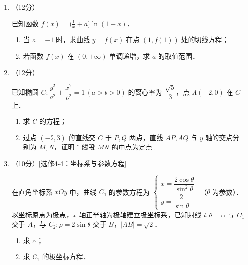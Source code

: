 \begin{description}
\begin{enumerate}[leftmargin=5pt]
        \begin{enumerate}[label=(\arabic*)]
            \item 证明：$EF\parallel$ 平面 $ADO$；
            \item 证明：平面 $ADO\perp$ 平面 $BEF$；
            \item 求二面角 $D$-$AO$-$C$ 的正弦值．
        \end{enumerate}

        \item （12分）

        已知函数 $f(x)=\bigl(\frac{1}{x}+a\bigr)\ln(1+x)$．

        \begin{enumerate}[label=(\arabic*)]
            \item 当 $a=-1$ 时，求曲线 $y=f(x)$ 在点 $(1,f(1))$ 处的切线方程；
            \item 若函数 $f(x)$ 在 $(0,+\infty)$ 单调递增，求 $a$ 的取值范围．
        \end{enumerate}

        \item （12分）

        已知椭圆 $C:\dfrac{y^2}{a^2}+\dfrac{x^2}{b^2}=1\,(a>b>0)$ 的离心率为 $\dfrac{\sqrt{5}}{3}$，点 $A(-2,0)$ 在 $C$ 上．

        \begin{enumerate}[label=(\arabic*)]
            \item 求 $C$ 的方程；
            \item 过点 $(-2,3)$ 的直线交 $C$ 于 $P,Q$ 两点，直线 $AP,AQ$ 与 $y$ 轴的交点分别为 $M,N$，证明：线段 $MN$ 的中点为定点．
        \end{enumerate}

        \item （10分）[选修4-4：坐标系与参数方程]

        在直角坐标系 $xOy$ 中，曲线 $C_1$ 的参数方程为 $\begin{cases}x=\dfrac{2\cos\theta}{\sin^2\theta},\\y=\dfrac{2}{\sin\theta}\end{cases}$（$\theta$ 为参数）．以坐标原点为极点，$x$ 轴正半轴为极轴建立极坐标系，已知射线 $l:\theta=\alpha$ 与 $C_1$ 交于 $A$，与 $C_2:\rho=2\sin\theta$ 交于 $B$，$|AB|=\sqrt{2}$．

        \begin{enumerate}[label=(\arabic*)]
            \item 求 $\alpha$；
            \item 求 $C_1$ 的极坐标方程．
        \end{enumerate}


\end{enumerate}
\end{description}
